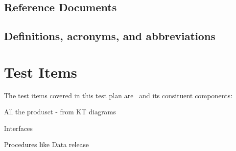 \subsection{Reference Documents}

\renewcommand{\refname}{}



\subsection{Definitions, acronyms, and abbreviations \label{sect:acronyms}} 


\section{Test Items}

The test items covered in this test plan are \product \ and its consituent components:

\begin{itemize_single}
\item All the produsct - from KT diagrams

\item Interfaces  
\item Procedures like Data release 
\end{itemize_single}


